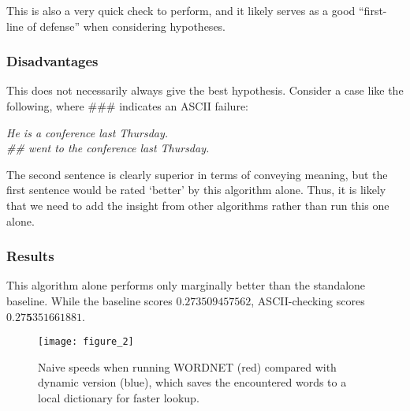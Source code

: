 \documentclass{article}
\begin{document}
This is also a very quick check to perform, and it likely serves as a good ``first-line of defense'' when considering hypotheses.

\subsubsection{Disadvantages}
This does not necessarily always give the best hypothesis. Consider a case like the following, where ### indicates an ASCII failure:

\textit{He is a conference last Thursday.} \\
\textit{## went to the conference last Thursday.}

The second sentence is clearly superior in terms of conveying meaning, but the first sentence would be rated `better' by this algorithm alone. Thus, it is likely that we need to add the insight from other algorithms rather than run this one alone.

\subsubsection{Results}
This algorithm alone performs only marginally better than the standalone baseline. While the baseline scores $0.273509457562$, ASCII-checking scores$0.27\textbf{5}351661881$.

\begin{figure}[ht]
\caption{Naive speeds when running WORDNET (red) compared with dynamic version (blue), which saves the encountered words to a local dictionary for faster lookup.}
\label{fig:dynamic}
\centering
\texttt{[image: figure\_2]}
\end{figure}
\end{document}
